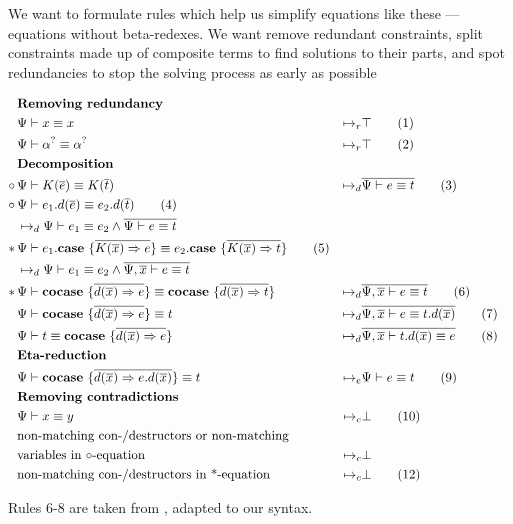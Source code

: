 \documentclass[twoside,12pt,a4paper]{article}
\begin{document}
We want to formulate rules which help us simplify equations like these --- equations without beta-redexes.
We want remove redundant constraints, split constraints made up of composite terms to find solutions to their parts,
and spot redundancies to stop the solving process as early as possible
\begin{definition}
    \begin{align*}
    &\textbf{Removing redundancy}\\
    &\Psi \vdash x\equiv x&\mapsto_r&\top
    \tag{1}\label{1}\\
    &\Psi \vdash \alpha^? \equiv \alpha^?&\mapsto_r& \top
    \tag{2}\\
    &\textbf{Decomposition}\\
    \circ\,&\Psi\vdash K(\overline{e})\equiv K(\overline{t})&
    \mapsto_d&\overline{\Psi\vdash e\equiv t}
    \tag{3}\label{3}\\
    \circ\,&\Psi \vdash e_1.d({\overline{e}})\equiv e_2.d({\overline{t}})\tag{4}\label{4}
    \\ &\mapsto_d \Psi\vdash e_1 \equiv e_2 \wedge \overline{\Psi\vdash e\equiv t}\\
    *\,&\Psi \vdash e_1.\textbf{case}\ \{\overline{K(\overline{x})\Rightarrow e}\}\equiv e_2.\textbf{case}\ \{\overline{K(\overline{x})\Rightarrow t}\}\tag{5}
    \\ &\mapsto_d \Psi \vdash e_1 \equiv e_2\wedge \overline{\Psi, \overline{x}\vdash e\equiv t}\\
    *\, &\Psi\vdash \textbf{cocase}\ \{\overline{d(\overline{x})\Rightarrow e}\}\equiv 
    \textbf{cocase}\ \{\overline{d(\overline{x})\Rightarrow t}\}
    &\mapsto_d& \overline{\Psi, \overline{x}\vdash e \equiv t}
    \tag{6}\label{6}\\
    &\Psi\vdash \textbf{cocase}\ \{\overline{d(\overline{x})\Rightarrow e}\}\equiv t 
    &\mapsto_d& \overline{\Psi,\overline{x} \vdash e \equiv t.d(\overline{x})}
    \tag{7}\label{7}\\ 
    &\Psi\vdash t\equiv \textbf{cocase}\ \{\overline{d(\overline{x})\Rightarrow e}\} 
    &\mapsto_d& \overline{\Psi, \overline{x}\vdash t.d(\overline{x}) \equiv e}
    \tag{8}\label{8}\\
    &\textbf{Eta-reduction}\\
    & \Psi \vdash \textbf{cocase}\ \{\overline{d(\overline{x})\Rightarrow e.d(\overline{x})}\}\equiv t
    &\mapsto_e&\Psi\vdash e\equiv t
    \tag{9}\\
    &\textbf{Removing contradictions}\\ 
    &\Psi \vdash x\equiv y &\mapsto_c& \bot 
    \tag{10}\\
    &\text{non-matching con-/destructors or non-matching}\\
    &\text{variables in }\text{$\circ$-equation} &\mapsto_c& \bot\\
    &\text{non-matching con-/destructors in *-equation}&\mapsto_c&\bot
    \tag{12}\label{12}\\
    \end{align*}
\end{definition}
Rules 6-8 are taken from \cite{10.5555/2021953.2021960}, adapted to our syntax. 
\end{document}
